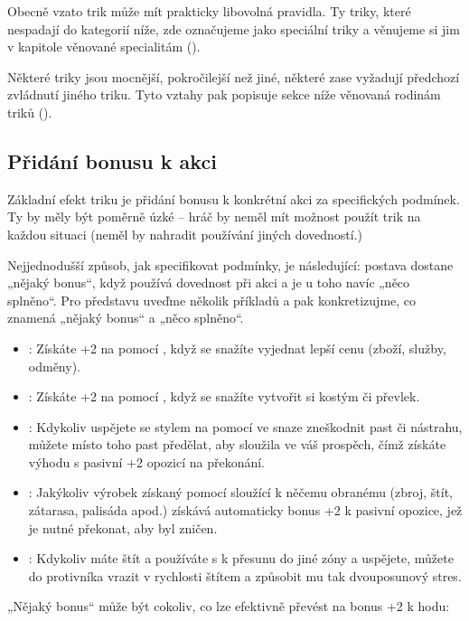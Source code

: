 \documentclass[../main.tex]{subfiles}
\begin{document}
Obecně vzato trik může mít prakticky libovolná pravidla. Ty triky, které nespadají do kategorií níže, zde označujeme jako speciální triky a věnujeme si jim v kapitole věnované specialitám ().

Některé triky jsou mocnější, pokročilejší než jiné, některé zase vyžadují předchozí zvládnutí jiného triku. Tyto vztahy pak popisuje sekce níže věnovaná rodinám triků (). 

\subsection{Přidání bonusu k akci}
\label{sec:trik-bonus}
Základní efekt triku je přidání bonusu k konkrétní akci za specifických podmínek. Ty by měly být poměrně úzké – hráč by neměl mít možnost použít trik na každou situaci (neměl by nahradit používání jiných dovedností.)

Nejjednodušší způsob, jak specifikovat podmínky, je následující: postava dostane „nějaký bonus“, když používá dovednost  při akci  a je u toho navíc „něco splněno“. Pro představu uveďme několik příkladů a pak konkretizujme, co znamená „nějaký bonus“ a „něco splněno“.

\begin{itemize}
\item {}:
  Získáte +2 na  pomocí , když se snažíte vyjednat lepší cenu (zboží, služby, odměny).
\item {}:
  Získáte +2 na  pomocí , když se snažíte vytvořit si kostým či převlek.
\item {}:
  Kdykoliv uspějete se stylem na  pomocí  ve snaze zneškodnit past či nástrahu, můžete místo toho past předělat, aby sloužila ve váš prospěch, čímž získáte výhodu  s pasivní +2 opozicí na překonání.
\item {}:
  Jakýkoliv výrobek získaný  pomocí  sloužící k něčemu obranému (zbroj, štít, zátarasa, palisáda apod.) získává automaticky bonus +2 k pasivní opozice, jež je nutné překonat, aby byl zničen.
\item {}:
  Kdykoliv máte štít a používáte  s  k přesunu do jiné zóny a uspějete, můžete do protivníka vrazit v rychlosti štítem a způsobit mu tak dvouposunový stres.

\end{itemize}
„Nějaký bonus“ může být cokoliv, co lze efektivně převést na bonus +2 k hodu:
\end{document}
